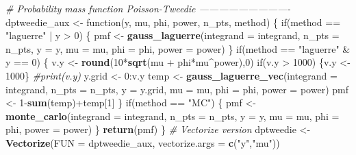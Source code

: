 \documentclass[9pt,a5paper,]{book}
\newenvironment{Shaded}{}{}
\newcommand{\KeywordTok}[1]{\textbf{{#1}}}
\newcommand{\DataTypeTok}[1]{\underline{{#1}}}
\newcommand{\DecValTok}[1]{{#1}}
\newcommand{\StringTok}[1]{{#1}}
\newcommand{\CommentTok}[1]{\textit{{#1}}}
\newcommand{\NormalTok}[1]{{#1}}
\renewenvironment{Shaded}{\color{inputcolor}}{}
\renewcommand{\DataTypeTok}[1]{{#1}}
\theoremstyle{definition}
\theoremstyle{definition}
\theoremstyle{remark}
\begin{document}
\begin{Shaded}
\begin{Highlighting}[]
\CommentTok{# Probability mass function Poisson-Tweedie ----------------------------}
\NormalTok{dptweedie_aux <-}\StringTok{ }\NormalTok{function(y, mu, phi, power, n_pts, method) \{}
    \NormalTok{if(method ==}\StringTok{ "laguerre"} \NormalTok{|}\StringTok{ }\NormalTok{y >}\StringTok{ }\DecValTok{0}\NormalTok{) \{}
        \NormalTok{pmf <-}\StringTok{ }\KeywordTok{gauss_laguerre}\NormalTok{(}\DataTypeTok{integrand =} \NormalTok{integrand, }\DataTypeTok{n_pts =} \NormalTok{n_pts,}
                              \DataTypeTok{y =} \NormalTok{y, }\DataTypeTok{mu =} \NormalTok{mu, }\DataTypeTok{phi =} \NormalTok{phi, }\DataTypeTok{power =} \NormalTok{power)}
    \NormalTok{\}}
    \NormalTok{if(method ==}\StringTok{ "laguerre"} \NormalTok{&}\StringTok{ }\NormalTok{y ==}\StringTok{ }\DecValTok{0}\NormalTok{) \{}
        \NormalTok{v.y <-}\StringTok{ }\KeywordTok{round}\NormalTok{(}\DecValTok{10}\NormalTok{*}\KeywordTok{sqrt}\NormalTok{(mu +}\StringTok{ }\NormalTok{phi*mu^power),}\DecValTok{0}\NormalTok{)}
        \NormalTok{if(v.y >}\StringTok{ }\DecValTok{1000}\NormalTok{) \{v.y <-}\StringTok{ }\DecValTok{1000}\NormalTok{\}}
        \CommentTok{#print(v.y)}
        \NormalTok{y.grid <-}\StringTok{ }\DecValTok{0}\NormalTok{:v.y}
        \NormalTok{temp <-}\StringTok{ }\KeywordTok{gauss_laguerre_vec}\NormalTok{(}\DataTypeTok{integrand =} \NormalTok{integrand, }\DataTypeTok{n_pts =} \NormalTok{n_pts,}
                                   \DataTypeTok{y =} \NormalTok{y.grid, }\DataTypeTok{mu =} \NormalTok{mu, }\DataTypeTok{phi =} \NormalTok{phi,}
                                   \DataTypeTok{power =} \NormalTok{power)}
        \NormalTok{pmf <-}\StringTok{ }\DecValTok{1}\NormalTok{-}\KeywordTok{sum}\NormalTok{(temp)+temp[}\DecValTok{1}\NormalTok{]}
    \NormalTok{\}}
    \NormalTok{if(method ==}\StringTok{ "MC"}\NormalTok{) \{}
        \NormalTok{pmf <-}\StringTok{ }\KeywordTok{monte_carlo}\NormalTok{(}\DataTypeTok{integrand =} \NormalTok{integrand, }\DataTypeTok{n_pts =} \NormalTok{n_pts,}
                           \DataTypeTok{y =} \NormalTok{y, }\DataTypeTok{mu =} \NormalTok{mu, }\DataTypeTok{phi =} \NormalTok{phi, }\DataTypeTok{power =} \NormalTok{power)}
    \NormalTok{\}}
    \KeywordTok{return}\NormalTok{(pmf)}
\NormalTok{\}}
\CommentTok{# Vectorize version}
\NormalTok{dptweedie <-}\StringTok{ }\KeywordTok{Vectorize}\NormalTok{(}\DataTypeTok{FUN =} \NormalTok{dptweedie_aux, }\DataTypeTok{vectorize.args =} \KeywordTok{c}\NormalTok{(}\StringTok{"y"}\NormalTok{,}\StringTok{"mu"}\NormalTok{))}
\end{Highlighting}
\end{Shaded}
\end{document}
